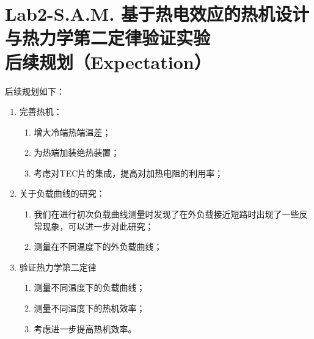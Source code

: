\documentclass[dvipsnames, svgnames,a4paper,11pt]{article}
\begin{document}
	
	
	
	
	
	
	
	
	
	
	
	
	\section{Lab2-S.A.M. 基于热电效应的热机设计与热力学第二定律验证实验\\ \quad\heiti 后续规划（Expectation）}
	
	后续规划如下：
	\begin{enumerate}
		\item 完善热机：
		\begin{enumerate}
			\item 增大冷端热端温差；
			\item 为热端加装绝热装置；
			\item 考虑对TEC片的集成，提高对加热电阻的利用率；
		\end{enumerate}
		
		\item 关于负载曲线的研究：
		\begin{enumerate}
			\item 我们在进行初次负载曲线测量时发现了在外负载接近短路时出现了一些反常现象，可以进一步对此研究；
			\item 测量在不同温度下的外负载曲线；
		\end{enumerate}
		
		\item 验证热力学第二定律
		\begin{enumerate}
			\item 测量不同温度下的负载曲线；
			\item 测量不同温度下的热机效率；
			\item 考虑进一步提高热机效率。
		\end{enumerate}
		
	\end{enumerate}
	
\end{document}
